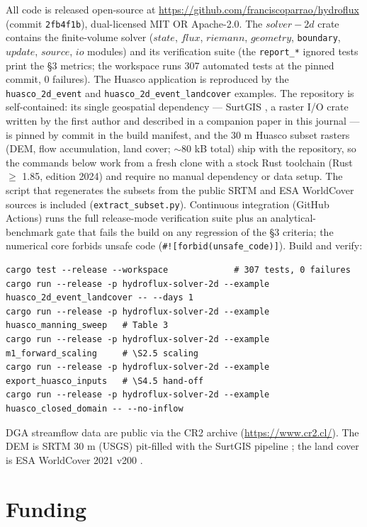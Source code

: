 \documentclass[preprint,review,12pt,authoryear]{elsarticle}
\begin{document}
All code is released open-source at \url{https://github.com/franciscoparrao/hydroflux}
(commit \texttt{2fb4f1b}), dual-licensed MIT OR Apache-2.0. The
$solver-2d$ crate contains the finite-volume solver ($state$, $flux$,
$riemann$, $geometry$, \texttt{boundary}, $update$, $source$, $io$ modules)
and its verification suite (the \texttt{report\_*} ignored tests print the \S3
metrics; the workspace runs 307 automated tests at the pinned commit,
0 failures). The Huasco application is
reproduced by the \texttt{huasco\_2d\_event} and \texttt{huasco\_2d\_event\_landcover}
examples. The repository is self-contained: its single
geospatial dependency --- SurtGIS \citep{SurtgisRef}, a raster I/O crate
written by the first author and described in a companion paper in this
journal --- is pinned by commit in the build manifest, and the 30 m Huasco subset
rasters (DEM, flow accumulation, land cover; $\sim$80 kB total) ship with
the repository, so the commands below work from a fresh clone with a
stock Rust toolchain (Rust $\geq$ 1.85, edition 2024) and require no manual
dependency or data setup. The script that regenerates the subsets from
the public SRTM and ESA WorldCover sources is included
(\texttt{extract\_subset.py}). Continuous
integration (GitHub Actions) runs the full release-mode verification
suite plus an analytical-benchmark gate that fails the build on any
regression of the \S3 criteria; the numerical core forbids unsafe code
(\texttt{\#![forbid(unsafe\_code)]}). Build and verify:

\begin{verbatim}
cargo test --release --workspace             # 307 tests, 0 failures
cargo run --release -p hydroflux-solver-2d --example huasco_2d_event_landcover -- --days 1
cargo run --release -p hydroflux-solver-2d --example huasco_manning_sweep   # Table 3
cargo run --release -p hydroflux-solver-2d --example m1_forward_scaling     # \S2.5 scaling
cargo run --release -p hydroflux-solver-2d --example export_huasco_inputs   # \S4.5 hand-off
cargo run --release -p hydroflux-solver-2d --example huasco_closed_domain -- --no-inflow
\end{verbatim}

DGA streamflow data are public via the CR2 archive
(\url{https://www.cr2.cl/}). The DEM is SRTM 30 m (USGS) pit-filled with
the SurtGIS pipeline \citep{SurtgisRef}; the land cover is ESA WorldCover
2021 v200 \citep{ESAWorldCover2021}.

\section*{Funding}
\end{document}
